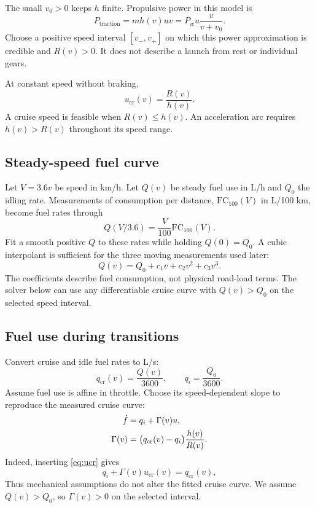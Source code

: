 \documentclass[conference,a4paper]{IEEEtran}
\newcommand{\cruise}{\mathrm{cr}}
\begin{document}
The small $v_0>0$ keeps $h$ finite. Propulsive power in this model is
\begin{equation}
P_{\mathrm{traction}}=mh(v)uv=P_wu\frac{v}{v+v_0}.
\end{equation}
Choose a positive speed interval $[v_-,v_+]$ on which this power approximation is credible and $R(v)>0$. It does not describe a launch from rest or individual gears.

At constant speed without braking,
\begin{equation}
u_{\cruise}(v)=\frac{R(v)}{h(v)}.
\label{eq:ucr}
\end{equation}
A cruise speed is feasible when $R(v)\le h(v)$. An acceleration arc requires $h(v)>R(v)$ throughout its speed range.

\subsection{Steady-speed fuel curve}
\label{sec:fuel}
Let $V=3.6v$ be speed in km/h. Let $Q(v)$ be steady fuel use in L/h and $Q_0$ the idling rate. Measurements of consumption per distance, $\mathrm{FC}_{100}(V)$ in L/100 km, become fuel rates through
\begin{equation}
Q(V/3.6)=\frac{V}{100}\mathrm{FC}_{100}(V).
\label{eq:Qconversion}
\end{equation}
Fit a smooth positive $Q$ to these rates while holding $Q(0)=Q_0$. A cubic interpolant is sufficient for the three moving measurements used later:
\begin{equation}
Q(v)=Q_0+c_1v+c_2v^2+c_3v^3.
\label{eq:Qfit}
\end{equation}
The coefficients describe fuel consumption, not physical road-load terms. The solver below can use any differentiable cruise curve with $Q(v)>Q_0$ on the selected speed interval.

\subsection{Fuel use during transitions}
Convert cruise and idle fuel rates to L/s:
\begin{equation}
q_{\cruise}(v)=\frac{Q(v)}{3600},\qquad q_i=\frac{Q_0}{3600}.
\end{equation}
Assume fuel use is affine in throttle. Choose its speed-dependent slope to reproduce the measured cruise curve:
\begin{align}
\dot f&=q_i+\Gamma(v)u,\notag\\
\Gamma(v)&=\bigl(q_{\cruise}(v)-q_i\bigr)\frac{h(v)}{R(v)}.
\label{eq:fuelmodel}
\end{align}
Indeed, inserting \eqref{eq:ucr} gives
\begin{equation}
q_i+\Gamma(v)u_{\cruise}(v)=q_{\cruise}(v),
\end{equation}
Thus mechanical assumptions do not alter the fitted cruise curve. We assume $Q(v)>Q_0$, so $\Gamma(v)>0$ on the selected interval.
\end{document}
